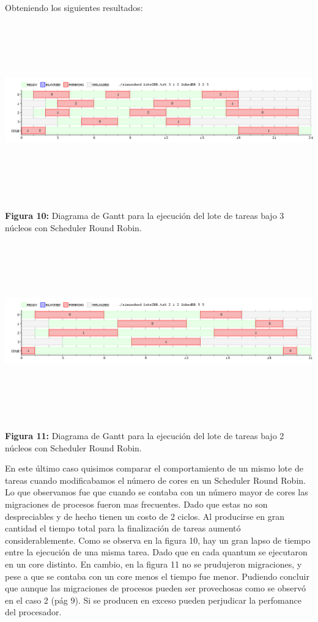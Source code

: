 \documentclass[a4paper]{article}
\begin{document}
	Obteniendo los siguientes resultados:

  \includegraphics[width=\textwidth,height=3.0in,keepaspectratio
]{imagenes/ej4/eje4.png} \newline
\begin {flushleft}
\textbf{Figura 10:} Diagrama de Gantt para la ejecuci\'on del lote de tareas bajo 3 n\'ucleos con Scheduler Round Robin.
\end{flushleft}




 \includegraphics[width=\textwidth,height=3.0in,keepaspectratio
]{imagenes/ej4/eje6.png} \newline
\begin {flushleft}
\textbf{Figura 11:} Diagrama de Gantt para la ejecuci\'on del lote de tareas bajo 2 n\'ucleos con Scheduler Round Robin.
\end{flushleft}
 

En este último caso quisimos comparar el comportamiento de un mismo lote de tareas cuando modificabamos el número de cores en un Scheduler Round Robin. Lo que observamos fue que cuando se contaba con un número mayor de cores las migraciones de procesos fueron mas frecuentes. Dado que estas no son despreciables y de hecho tienen un costo de 2 ciclos. Al producirse en gran cantidad el tiempo total para la finalización de tareas aumentó considerablemente. Como se observa en la figura 10, hay un gran lapso de tiempo entre la ejecución de una misma tarea. Dado que en cada quantum se ejecutaron en un core distinto. En cambio, en la figura 11 no se prudujeron migraciones, y pese a que se contaba con un core menos el tiempo fue menor. Pudiendo concluir que aunque las migraciones de procesos pueden ser provechosas como se observó en el caso 2 (pág 9). Si se producen en exceso pueden perjudicar la perfomance del procesador.  
\end{document}
